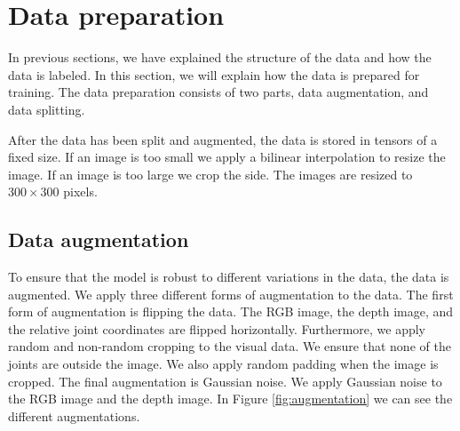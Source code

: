 \section{Data preparation}
\label{sec:data_preparation}

In previous sections, we have explained the structure of the data and how the data is labeled. In this section, we will explain how the data is prepared for training. The data preparation consists of two parts, data augmentation, and data splitting.

After the data has been split and augmented, the data is stored in tensors of a fixed size. If an image is too small we apply a bilinear interpolation to resize the image. If an image is too large we crop the side. The images are resized to $300 \times 300$ pixels.

\subsection{Data augmentation}
\label{sec:data_augmentation}

To ensure that the model is robust to different variations in the data, the data is augmented. We apply three different forms of augmentation to the data. The first form of augmentation is flipping the data. The RGB image, the depth image, and the relative joint coordinates are flipped horizontally. Furthermore, we apply random and non-random cropping to the visual data. We ensure that none of the joints are outside the image. We also apply random padding when the image is cropped. The final augmentation is Gaussian noise. We apply Gaussian noise to the RGB image and the depth image. In Figure \ref{fig:augmentation} we can see the different augmentations.

